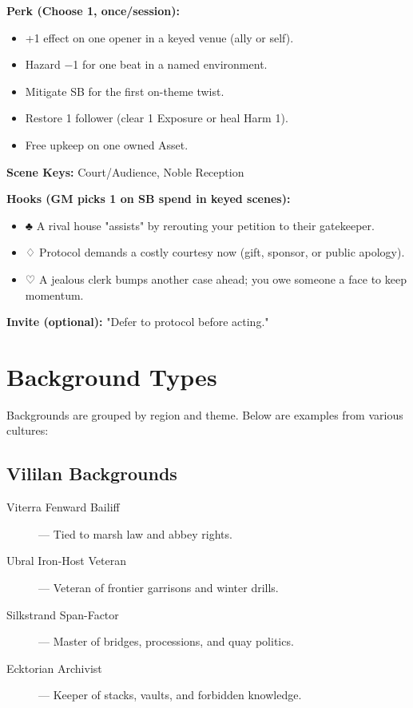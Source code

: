 \textbf{Perk (Choose 1, once/session):}
\begin{itemize}
  \item +1 effect on one opener in a keyed venue (ally or self).
  \item Hazard −1 for one beat in a named environment.
  \item Mitigate SB for the first on-theme twist.
  \item Restore 1 follower (clear 1 Exposure or heal Harm 1).
  \item Free upkeep on one owned Asset.
\end{itemize}

\textbf{Scene Keys:} Court/Audience, Noble Reception

\textbf{Hooks (GM picks 1 on SB spend in keyed scenes):}
\begin{itemize}
  \item ♣ A rival house "assists" by rerouting your petition to their gatekeeper.
  \item ♢ Protocol demands a costly courtesy now (gift, sponsor, or public apology).
  \item ♡ A jealous clerk bumps another case ahead; you owe someone a face to keep momentum.
\end{itemize}

\textbf{Invite (optional):} "Defer to protocol before acting."

\section{Background Types}

Backgrounds are grouped by region and theme. Below are examples from various cultures:

\subsection*{Vililan Backgrounds}

\begin{description}
  \item[Viterra Fenward Bailiff] — Tied to marsh law and abbey rights.
  \item[Ubral Iron-Host Veteran] — Veteran of frontier garrisons and winter drills.
  \item[Silkstrand Span-Factor] — Master of bridges, processions, and quay politics.
  \item[Ecktorian Archivist] — Keeper of stacks, vaults, and forbidden knowledge.
\end{description}

